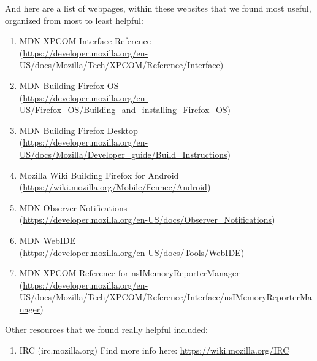 \documentclass[12pt]{article}
\begin{document}
And here are a list of webpages, within these websites that we found most useful, organized from most to least helpful:
\begin{enumerate}
	\item MDN XPCOM Interface Reference\\ (\href{https://developer.mozilla.org/en-US/docs/Mozilla/Tech/XPCOM/Reference/Interface}{https://developer.mozilla.org/en-US/docs/Mozilla/Tech/XPCOM/Reference/Interface})
	\item MDN Building Firefox OS\\ (\href{https://developer.mozilla.org/en-US/Firefox\_OS/Building\_and\_installing\_Firefox\_OS}{https://developer.mozilla.org/en-US/Firefox\_OS/Building\_and\_installing\_Firefox\_OS})
	\item MDN Building Firefox Desktop \\(\href{https://developer.mozilla.org/en-US/docs/Mozilla/Developer\_guide/Build\_Instructions}{https://developer.mozilla.org/en-US/docs/Mozilla/Developer\_guide/Build\_Instructions})
	\item Mozilla Wiki Building Firefox for Android \\ (\href{https://wiki.mozilla.org/Mobile/Fennec/Android}{https://wiki.mozilla.org/Mobile/Fennec/Android})
	\item MDN Observer Notifications \\ (\href{https://developer.mozilla.org/en-US/docs/Observer\_Notifications}{https://developer.mozilla.org/en-US/docs/Observer\_Notifications})
	\item MDN WebIDE \\(\href{https://developer.mozilla.org/en-US/docs/Tools/WebIDE}{https://developer.mozilla.org/en-US/docs/Tools/WebIDE})
	\item MDN XPCOM Reference for nsIMemoryReporterManager \\ (\href{https://developer.mozilla.org/en-US/docs/Mozilla/Tech/XPCOM/Reference/Interface/nsIMemoryReporterManager}{https://developer.mozilla.org/en-US/docs/Mozilla/Tech/XPCOM/Reference/Interface/nsIMemoryReporterManager})
\end{enumerate}

\noindent Other resources that we found really helpful included:
\begin{enumerate}
	\item IRC (irc.mozilla.org)
		\subitem Find more info here: \href{https://wiki.mozilla.org/IRC}{https://wiki.mozilla.org/IRC}
\end{enumerate}
\pagebreak
\end{document}
